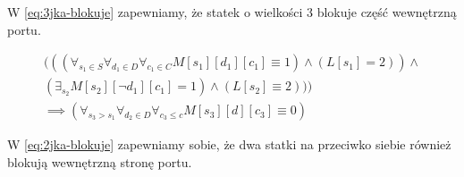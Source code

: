 W \ref{eq:3jka-blokuje} zapewniamy, że statek o wielkości 3 blokuje część wewnętrzną portu.

\begin{equation} \label{eq:2jka-blokuje}
    \begin{split}
        (((\forall_{s_1\in S}\forall_{d_1\in D}\forall_{c_1 \in C}  M[s_1][d_1][c_1] \equiv 1) \land (L[s_1] = 2 )) \land \\
        ( \exists_{s_2} M[s_2][ \neg d_1][c_1] = 1) \land ( L[s_2] \equiv 2 ))  ) \\
        \implies (\forall_{s_3>s_1} \forall_{d_2 \in D} \forall_{c_3 \leq c} M[s_3][d][c_3] \equiv 0)
    \end{split}
\end{equation}

W \ref{eq:2jka-blokuje} zapewniamy sobie, że dwa statki na przeciwko siebie również blokują wewnętrzną stronę portu.

